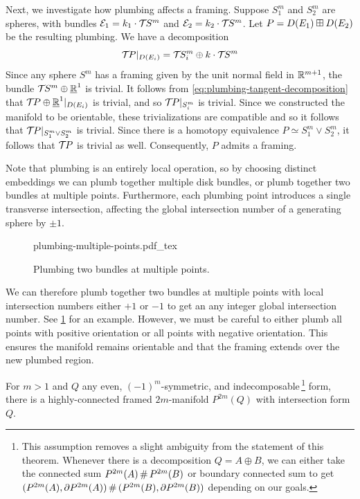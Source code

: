 Next, we investigate how plumbing affects a framing.
Suppose $S_1^m$ and $S_2^m$ are spheres, with bundles $\mathcal{E}_1 = k_1\cdot {\mathcal{T}\hspace{-0.1em}} S^m$ and $\mathcal{E}_2=k_2\cdot {\mathcal{T}\hspace{-0.1em}} S^m$. Let $P=D(E_1)\boxplus D(E_2)$ be the resulting plumbing. We have a decomposition
	\begin{equation}\label{eq:plumbing-tangent-decomposition}
		{\mathcal{T}\hspace{-0.1em}} P|_{D(E_i)} = {\mathcal{T}\hspace{-0.1em}} S^m_i\oplus k\cdot {\mathcal{T}\hspace{-0.1em}} S^m
	\end{equation}
	Since any sphere $S^m$ has a framing given by the unit normal field in $\mathbb{R}^{m+1}$, the bundle ${\mathcal{T}\hspace{-0.1em}} S^m\oplus\underline{\mathbb{R}}^1$ is trivial.
	It follows from \cref{eq:plumbing-tangent-decomposition} that ${\mathcal{T}\hspace{-0.1em}} P\oplus \underline{\mathbb{R}}^1|_{D(E_i)}$ is trivial, and so ${\mathcal{T}\hspace{-0.1em}} P|_{S_i^m}$ is trivial. Since we constructed the manifold to be orientable, these trivializations are compatible and so it follows that ${\mathcal{T}\hspace{-0.1em}} P|_{S_1^m\vee S_2^m}$ is trivial. Since there is a homotopy equivalence $P\simeq S_1^m\vee S_2^m$, it follows that ${\mathcal{T}\hspace{-0.1em}} P$ is trivial as well. Consequently, $P$ admits a framing. 

Note that plumbing is an entirely local operation, so by choosing distinct embeddings we can plumb together multiple disk bundles, or plumb together two bundles at multiple points. Furthermore, each plumbing point introduces a single transverse intersection, affecting the global intersection number of a generating sphere by $\pm 1$.
\begin{figure}[ht]
	\centering
	{plumbing-multiple-points.pdf_tex}
	\caption{Plumbing two bundles at multiple points.}\label{fig:plumbing-at-multiple-points}
\end{figure}
We can therefore plumb together two bundles at multiple points with local intersection numbers either $+1$ or $-1$ to get an any integer global intersection number. See \cref{fig:plumbing-at-multiple-points} for an example. However, we must be careful to either plumb all points with positive orientation or all points with negative orientation. This ensures the manifold remains orientable and that the framing extends over the new plumbed region.

\begin{proposition}\label{thm:plumbing-existence-theorem}
	For $m>1$ and $Q$ any even, $(-1)^m$-symmetric, and indecomposable\,\footnote{This assumption removes a slight ambiguity from the statement of this theorem. Whenever there is a decomposition $Q=A\oplus B$, we can either take the connected sum $P^{2m}(A)\+P^{2m}(B)$ or boundary connected sum to get $(P^{2m}(A),\partial P^{2m}(A))\+ (P^{2m}(B),\partial P^{2m}(B))$ depending on our goals.} form, there is a highly-connected framed $2m$-manifold $P^{2m}(Q)$ with intersection form $Q$.
\end{proposition}

